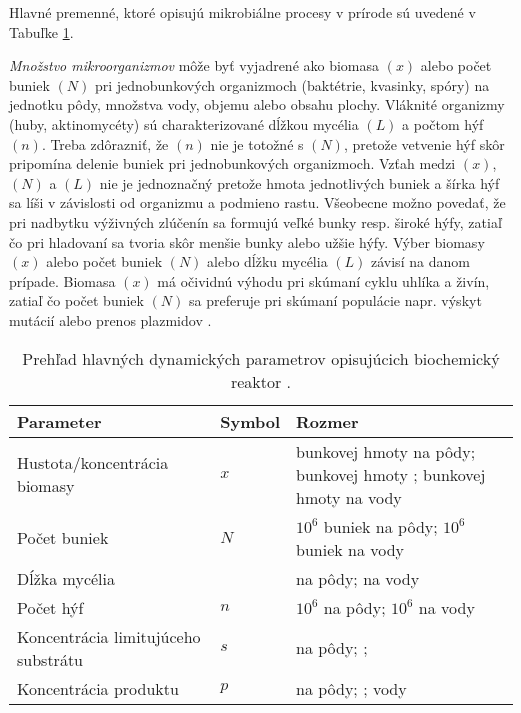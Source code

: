 Hlavné premenné, ktoré opisujú mikrobiálne procesy v prírode sú uvedené v Tabuľke \ref{tab: 1}.

\textit{Množstvo mikroorganizmov} môže byť vyjadrené ako biomasa $(x)$ alebo počet buniek $(N)$ pri jednobunkových organizmoch (baktétrie, kvasinky, spóry) na jednotku pôdy, množstva vody, objemu alebo obsahu plochy. Vláknité organizmy (huby, aktinomycéty) sú charakterizované dĺžkou mycélia $(L)$ a počtom hýf $(n)$. Treba zdôrazniť, že $(n)$ nie je totožné s $(N)$, pretože vetvenie hýf skôr pripomína delenie buniek pri jednobunkových organizmoch. Vzťah medzi $(x)$, $(N)$ a $(L)$ nie je jednoznačný pretože hmota jednotlivých buniek a šírka hýf sa líši v závislosti od organizmu a podmieno rastu. Všeobecne možno povedať, že pri nadbytku výživných zlúčenín sa formujú veľké bunky resp. široké hýfy, zatiaľ čo pri hladovaní sa tvoria skôr menšie bunky alebo užšie hýfy. Výber biomasy $(x)$ alebo počet buniek $(N)$ alebo dĺžku mycélia $(L)$ závisí na danom prípade. Biomasa $(x)$ má očividnú výhodu pri skúmaní cyklu uhlíka a živín, zatiaľ čo počet buniek $(N)$ sa preferuje pri skúmaní populácie napr. výskyt mutácií alebo prenos plazmidov \cite{ref2}.

\begin{table}
	\centering
	\caption{Prehľad hlavných dynamických parametrov opisujúcich biochemický reaktor \cite{ref2}.}
	\label{tab: 1}
	\begin{tabular}{p{5cm} p{1.9cm} p{4cm}}
		\hline
		\textbf{Parameter} & \textbf{Symbol} & \textbf{Rozmer} \\ 
		\hline
		Hustota/koncentrácia biomasy & $x$ & \micg bunkovej hmoty na \gram pôdy; \gram bunkovej hmoty \unitfrac{1}{\squaremeter}; \micg bunkovej hmoty na \ml vody\\
		Počet buniek & $N$ & $10^{6}$ buniek na \gram pôdy; $10^{6}$ buniek na \ml vody\\
		Dĺžka mycélia & \liter & \meter na \gram pôdy; \meter na \ml vody\\
		Počet hýf & $n$ & $10^{6}$ na \gram pôdy; $10^{6}$ na \ml vody\\
		Koncentrácia limitujúceho substrátu & $s$ & \milligram na \gram pôdy; \unitfrac{\gram}{\squaremeter};\unitfrac{\gram}{\liter vody}\\
		Koncentrácia produktu & $p$ & \milligram na \gram pôdy; \unitfrac{\gram}{\squaremeter}; \unitfrac{\gram}{\liter} vody\\
		\hline	
	\end{tabular}
\end{table}

